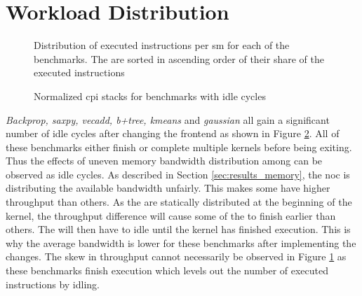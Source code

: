 \section{Workload Distribution} \label{sec:workload_dist}

\begin{figure}

\caption[Distribution of executed instructions per \acrshort{sm}.]{Distribution of executed instructions per \acrshort{sm} for each of the benchmarks. The  are sorted in ascending order of their share of the executed instructions}
\label{fig:instruction_distribution}
\end{figure}

\begin{figure}
    \centering
    \caption{Normalized \acrshort{cpi} stacks for benchmarks with idle cycles}
    \label{fig:norm_cpi_idle}
\end{figure}

\textit{Backprop, saxpy, vecadd, b+tree, kmeans} and \textit{gaussian} all gain a significant number of idle cycles after changing the frontend as shown in Figure \ref{fig:norm_cpi_idle}. All of these benchmarks either finish or complete multiple kernels before being exiting. Thus the effects of uneven memory bandwidth distribution among  can be observed as idle cycles. As described in Section \ref{sec:results_memory}, the \acrshort{noc} is distributing the available bandwidth unfairly. This makes some  have higher throughput than others. As the  are statically distributed at the beginning of the kernel, the throughput difference will cause some of the  to finish earlier than others. The  will then have to idle until the kernel has finished execution. This is why the average bandwidth is lower for these benchmarks after implementing the changes. The skew in throughput cannot necessarily be observed in Figure \ref{fig:instruction_distribution} as these benchmarks finish execution which levels out the number of executed instructions by  idling.

